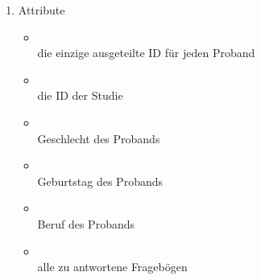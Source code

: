 \documentclass[a4paper]{scrreprt}
\begin{document}
{                    \begin{enumerate}
                        \item Attribute
                            \begin{itemize}
                                \item {\large {}}\\
                                    die einzige ausgeteilte ID für jeden Proband
                                \item {\large {}}\\
                                    die ID der Studie
                                \item {\large {}}\\
                                    Geschlecht des Probands
                                \item {\large {}}\\
                                    Geburtstag des Probands
                                \item {\large {}}\\
                                    Beruf des Probands
                                \item {\large {}}\\
                                    alle zu antwortene Fragebögen
                            \end{itemize}


\end{enumerate}}
\end{document}

